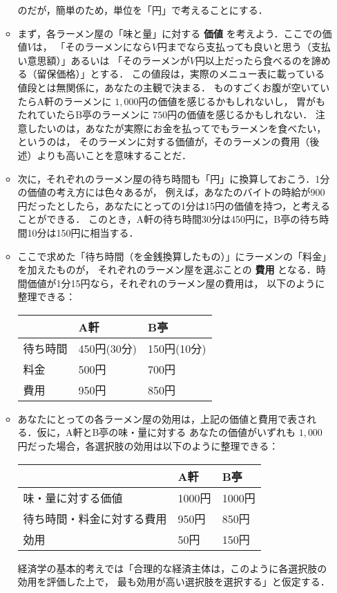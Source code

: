 \documentclass[platex,12pt,a4paper]{jsarticle}
\begin{document}
\begin{itemize}
\begin{itemize}
{}
のだが，簡単のため，単位を「円」で考えることにする．
\item まず，各ラーメン屋の「味と量」に対する \textbf{\textbf{価値}} を考えよう．ここでの価値\(V\)は，
「そのラーメンになら\(V\)円までなら支払っても良いと思う（支払い意思額）」あるいは
「そのラーメンが\(V\)円以上だったら食べるのを諦める（留保価格）」とする．
この値段は，実際のメニュー表に載っている値段とは無関係に，あなたの主観で決まる．
ものすごくお腹が空いていたらA軒のラーメンに \(1,000\)円の価値を感じるかもしれないし，
胃がもたれていたらB亭のラーメンに \(750\)円の価値を感じるかもしれない．
注意したいのは，あなたが実際にお金を払ってでもラーメンを食べたい，というのは，
そのラーメンに対する価値が，そのラーメンの費用（後述）よりも高いことを意味することだ．
\item 次に，それぞれのラーメン屋の待ち時間も「円」に換算しておこう．1分の価値の考え方には色々あるが，
例えば，あなたのバイトの時給が900円だったとしたら，あなたにとっての1分は15円の価値を持つ，と考えることができる．
このとき，A軒の待ち時間30分は450円に，B亭の待ち時間10分は150円に相当する．
\item ここで求めた「待ち時間（を金銭換算したもの）」にラーメンの「料金」を加えたものが，
それぞれのラーメン屋を選ぶことの \textbf{\textbf{費用}} となる．時間価値が1分15円なら，それぞれのラーメン屋の費用は，
以下のように整理できる：
\begin{center}
\begin{tabular}{lll}
\hline
 & A軒 & B亭\\
\hline
待ち時間 & 450円(30分) & 150円(10分)\\
料金 & 500円 & 700円\\
\hline
費用 & 950円 & 850円\\
\hline
\end{tabular}
\end{center}
\item あなたにとっての各ラーメン屋の効用は，上記の価値と費用で表される．仮に，A軒とB亭の味・量に対する
あなたの価値がいずれも \(1,000\) 円だった場合，各選択肢の効用は以下のように整理できる：
\begin{center}
\begin{tabular}{lll}
\hline
 & A軒 & B亭\\
\hline
味・量に対する価値 & 1000円 & 1000円\\
待ち時間・料金に対する費用 & 950円 & 850円\\
\hline
効用 & 50円 & 150円\\
\hline
\end{tabular}
\end{center}

経済学の基本的考えでは「合理的な経済主体は，このように各選択肢の効用を評価した上で，
最も効用が高い選択肢を選択する」と仮定する．
\end{itemize}
\end{itemize}
\end{document}
